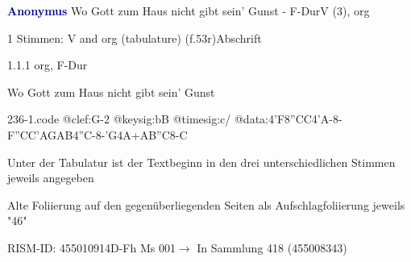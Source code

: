 \documentclass[twocolumn]{book}
\begin{document}
\par \vspace{7pt} \textcolor{darkblue}{\textbf{Anonymus  }}\hfillplus{\textbf{[236]}}\newline Wo Gott zum Haus nicht gibt sein' Gunst - F-Dur\newline V (3), org
\par \begin{itshape}\end{itshape} 
\par \textcolor{darkblue}{}  1 Stimmen: V and org (tabulature)  (f.53r)\newline Abschrift
\par 1.1.1  org, F-Dur\newline \begin{footnotesize} Wo Gott zum Haus nicht gibt sein' Gunst \end{footnotesize}  
\begin{filecontents*}{236-1.code}
@clef:G-2
@keysig:bB
@timesig:c/
@data:4'F{8''CC}4'A-8-F{''CC}{'AGAB}4''C-8-'G4A+AB''C8-C
\end{filecontents*}
\newline
%
\par Unter der Tabulatur ist der Textbeginn in den drei unterschiedlichen Stimmen jeweils angegeben
\par Alte Foliierung auf den gegenüberliegenden Seiten als Aufschlagfoliierung jeweils "46"
\par RISM-ID: 455010914\newline D-Fh  Ms 001\newline $\rightarrow$ In Sammlung 418 (455008343)
      
\end{document}
